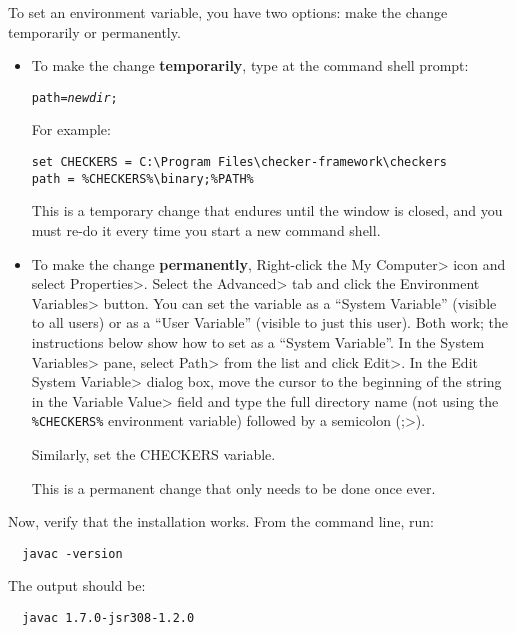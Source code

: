\begin{enumerate}

To set an environment variable, you have two options:  make the change
temporarily or permanently.
\begin{itemize}
\item
To make the change \textbf{temporarily}, type at the command shell prompt:

\begin{alltt}
path = \emph{newdir};%PATH%
\end{alltt}

For example:

\begin{Verbatim}
set CHECKERS = C:\Program Files\checker-framework\checkers
path = %CHECKERS%\binary;%PATH%
\end{Verbatim}

This is a temporary change that endures until the window is closed, and you
must re-do it every time you start a new command shell.

\item
To make the change \textbf{permanently},
Right-click the \<My Computer> icon and
select \<Properties>. Select the \<Advanced> tab and click the
\<Environment Variables> button. You can set the variable as a ``System
Variable'' (visible to all users) or as a ``User Variable'' (visible to
just this user).  Both work; the instructions below show how to set as a
``System Variable''.
In the \<System Variables> pane, select
\<Path> from the list and click \<Edit>. In the \<Edit System Variable>
dialog box, move the cursor to the beginning of the string in the
\<Variable Value> field and type the full directory name (not using the
\verb|%CHECKERS%| environment variable) followed by a
semicolon (\<;>).

Similarly, set the CHECKERS variable.

This is a permanent change that only needs to be done once ever.
\end{itemize}



Now, verify that the installation works.  From the command line, run:

\begin{Verbatim}
  javac -version
\end{Verbatim}

The output should be:

\begin{Verbatim}
  javac 1.7.0-jsr308-1.2.0
\end{Verbatim}

\end{enumerate}


